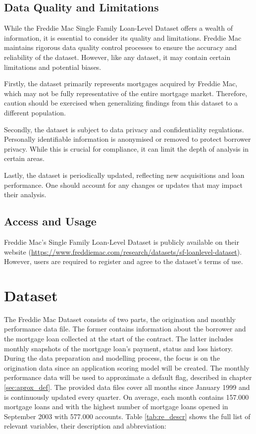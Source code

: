 \subsection{Data Quality and Limitations}

While the Freddie Mac Single Family Loan-Level Dataset offers a wealth of information, it is essential to consider its quality and limitations. Freddie Mac maintains rigorous data quality control processes to ensure the accuracy and reliability of the dataset. However, like any dataset, it may contain certain limitations and potential biases.

Firstly, the dataset primarily represents mortgages acquired by Freddie Mac, which may not be fully representative of the entire mortgage market. Therefore, caution should be exercised when generalizing findings from this dataset to a different population.

Secondly, the dataset is subject to data privacy and confidentiality regulations. Personally identifiable information is anonymised or removed to protect borrower privacy. While this is crucial for compliance, it can limit the depth of analysis in certain areas.

Lastly, the dataset is periodically updated, reflecting new acquisitions and loan performance. One should account for any changes or updates that may impact their analysis.

\subsection{Access and Usage}

Freddie Mac's Single Family Loan-Level Dataset is publicly available on their website (\url{https://www.freddiemac.com/research/datasets/sf-loanlevel-dataset}). However, users are required to register and agree to the dataset's terms of use.

\section{Dataset}

The Freddie Mac Dataset consists of two parts, the origination and monthly performance data file. The former contains information about the borrower and the mortgage loan collected at the start of the contract. The latter includes monthly snapshots of the mortgage loan's payment, status and loss history. During the data preparation and modelling process, the focus is on the origination data since an application scoring model will be created. The monthly performance data will be used to approximate a default flag, described in chapter \ref{sec:aprox_def}. The provided data files cover all months since January 1999 and is continuously updated every quarter. On average, each month contains 157.000 mortgage loans and with the highest number of mortgage loans opened in September 2003 with 577.000 accounts. Table \ref{tab:re_descr} shows the full list of relevant variables, their description and abbreviation:


